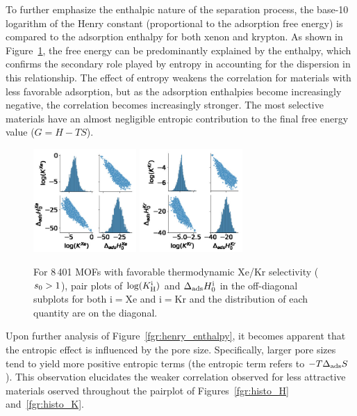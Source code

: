 \documentclass[main.tex]{subfiles}
\begin{document}
To further emphasize the enthalpic nature of the separation process, the base-10 logarithm of the Henry constant (proportional to the adsorption free energy) is compared to the adsorption enthalpy for both xenon and krypton. As shown in Figure~\ref{fgr:SI:HK}, the free energy can be predominantly explained by the enthalpy, which confirms the secondary role played by entropy in accounting for the dispersion in this relationship. The effect of entropy weakens the correlation for materials with less favorable adsorption, but as the adsorption enthalpies become increasingly negative, the correlation becomes increasingly stronger. The most selective materials have an almost negligible entropic contribution to the final free energy value ($G=H-TS$).

\begin{figure}[ht]
  \centering
    \includegraphics[width=0.35\textwidth]{figures/2-thermo/H_K_Xe.jpg}
    \includegraphics[width=0.35\textwidth]{figures/2-thermo/H_K_Kr.jpg}
    \caption{For 8\,401 MOFs with favorable thermodynamic Xe/Kr selectivity ($s_{\text{0}} > 1$), pair plots of $\log(K_{\text{H}}^{\text{i}})$ and $\Delta_{\text{ads}}H^{\text{i}}_{\text{0}}$ in the off-diagonal subplots for both i$=$Xe and i$=$Kr and the distribution of each quantity are on the diagonal.}\label{fgr:SI:HK}
\end{figure}

Upon further analysis of Figure~\ref{fgr:henry_enthalpy}, it becomes apparent that the entropic effect is influenced by the pore size. Specifically, larger pore sizes tend to yield more positive entropic terms (the entropic term refers to $-T\Delta_{\text{ads}}S$). This observation elucidates the weaker correlation observed for less attractive materials oserved throughout the pairplot of Figures~\ref{fgr:histo_H} and~\ref{fgr:histo_K}.
\end{document}
